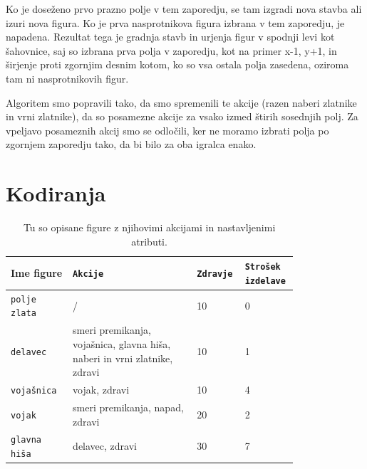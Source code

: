 \documentclass[a4paper, 12pt]{book}
\begin{document}
Ko je doseženo prvo prazno polje v tem zaporedju, se tam izgradi nova stavba ali izuri nova figura.
Ko je prva nasprotnikova figura izbrana v tem zaporedju, je napadena.
Rezultat tega je gradnja stavb in urjenja figur v spodnji levi kot šahovnice, saj so izbrana prva polja v zaporedju, kot na primer x-1, y+1, in širjenje proti zgornjim desnim kotom, ko so vsa ostala polja zasedena, oziroma tam ni nasprotnikovih figur.

Algoritem smo popravili tako, da smo spremenili te akcije (razen naberi zlatnike in vrni zlatnike), da so posamezne akcije za vsako izmed štirih sosednjih polj.
Za vpeljavo posameznih akcij smo se odločili, ker ne moramo izbrati polja po zgornjem zaporedju tako, da bi bilo za oba igralca enako.

\section{Kodiranja}
\label{kodiranja}
\begin{table}

	\begin{center}
		
	\begin{tabular}{p{0.2\linewidth}|p{0.4\linewidth}|p{0.1\linewidth}|p{0.1\linewidth}}
		Ime figure          & {\tt Akcije}                                                              & {\tt Zdravje} & {\tt Strošek izdelave} \\ \hline
		{\tt polje zlata}   & /                                                                         & 10            & 0 \\
		{\tt delavec}       & smeri premikanja, vojašnica, glavna hiša, naberi in vrni zlatnike, zdravi & 10            & 1 \\
		{\tt vojašnica}     & vojak, zdravi                                                             & 10            & 4 \\
		{\tt vojak}         & smeri premikanja, napad, zdravi                                           & 20            & 2 \\
		{\tt glavna hiša}   & delavec, zdravi                                                           & 30            & 7 \\
	\end{tabular}
	\end{center}
	\caption{Tu so opisane figure z njihovimi akcijami in nastavljenimi atributi.}
	\label{tabelfigures}
\end{table}
\end{document}
